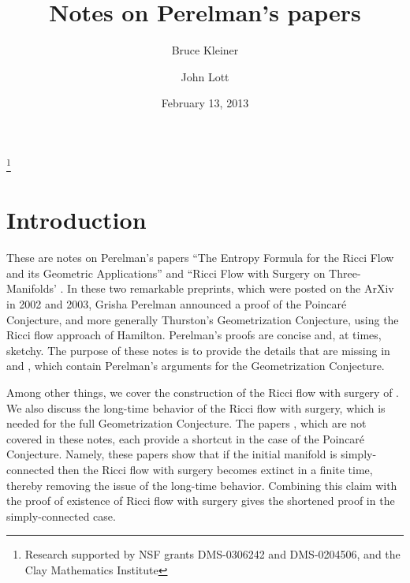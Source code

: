 \documentclass[12pt]{amsart}
\numberwithin{equation}{section}
\theoremstyle{plain}
\theoremstyle{definition}
\theoremstyle{remark}
\begin{document}
\title{Notes on Perelman's papers}
\author{Bruce Kleiner}
\address{Department of Mathematics\\
Yale University\\
New Haven, CT  06520-8283\\
USA}
\author{John Lott}
\address{Department of Mathematics\\
University of Michigan\\
Ann Arbor, MI  48109-1109\\
USA}
\thanks{Research supported by NSF grants DMS-0306242 and DMS-0204506,
and the Clay Mathematics Institute}
\date{February 13, 2013}
\maketitle


\section{Introduction}


These are notes on Perelman's papers 
``The Entropy Formula for the Ricci Flow and its Geometric
Applications'' \cite{Perelman} and ``Ricci Flow with Surgery 
on Three-Manifolds' \cite{Perelman2}.  
In these two remarkable preprints, which were posted on the ArXiv 
in  2002 and 2003, Grisha Perelman
announced a proof of the Poincar\'e Conjecture, and more generally Thurston's
Geometrization Conjecture, using the Ricci flow approach of Hamilton.  
Perelman's proofs are concise and,
at times, sketchy. The purpose of these notes is to provide the details
that are missing in
\cite{Perelman} and \cite{Perelman2}, which contain Perelman's arguments for 
the Geometrization Conjecture.  

Among other things, 
we cover the construction of the Ricci flow with surgery 
of \cite{Perelman2}.
We also discuss the long-time behavior of the 
Ricci flow with surgery, which is needed for the full Geometrization
Conjecture.
The papers \cite{Colding-Minicozzi,Perelman3},
which are not covered in these notes, 
each provide a shortcut in the case of the Poincar\'e Conjecture.
Namely, these papers show
that if the initial manifold is simply-connected then the 
Ricci flow with surgery becomes extinct in a
finite time, thereby removing the issue of the long-time
behavior. Combining this claim with the proof of existence of
Ricci flow with surgery gives 
the shortened proof in the simply-connected case.
\end{document}
